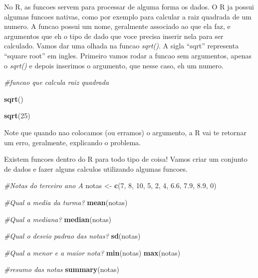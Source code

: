 \documentclass[
]{book}
\newenvironment{Shaded}{\begin{snugshade}}{\end{snugshade}}
\newcommand{\CommentTok}[1]{\textcolor[rgb]{0.56,0.35,0.01}{\textit{#1}}}
\newcommand{\DecValTok}[1]{\textcolor[rgb]{0.00,0.00,0.81}{#1}}
\newcommand{\FloatTok}[1]{\textcolor[rgb]{0.00,0.00,0.81}{#1}}
\newcommand{\FunctionTok}[1]{\textcolor[rgb]{0.13,0.29,0.53}{\textbf{#1}}}
\newcommand{\NormalTok}[1]{#1}
\newcommand{\OtherTok}[1]{\textcolor[rgb]{0.56,0.35,0.01}{#1}}
\begin{document}
No R, as funcoes servem para processar de alguma forma os dados. O R ja possui algumas funcoes nativas, como por exemplo para calcular a raiz quadrada de um numero. A funcao possui um nome, geralmente associado ao que ela faz, e argumentos que eh o tipo de dado que voce precisa inserir nela para ser calculado. Vamos dar uma olhada na funcao \emph{sqrt()}. A sigla ``sqrt'' representa ``square root'' em ingles. Primeiro vamos rodar a funcao sem argumentos, apenas o \emph{sqrt()} e depois inserimos o argumento, que nesse caso, eh um numero.

\begin{Shaded}
\begin{Highlighting}[]
\CommentTok{\#funcao que calcula raiz quadrada}

\FunctionTok{sqrt}\NormalTok{()}

\FunctionTok{sqrt}\NormalTok{(}\DecValTok{25}\NormalTok{)}
\end{Highlighting}
\end{Shaded}

Note que quando nao colocamos (ou erramos) o argumento, a R vai te retornar um erro, geralmente, explicando o problema.

Existem funcoes dentro do R para todo tipo de coisa! Vamos criar um conjunto de dados e fazer alguns calculos utilizando algumas funcoes.

\begin{Shaded}
\begin{Highlighting}[]
\CommentTok{\#Notas do terceiro ano A}
\NormalTok{notas }\OtherTok{\textless{}{-}} \FunctionTok{c}\NormalTok{(}\DecValTok{7}\NormalTok{, }\DecValTok{8}\NormalTok{, }\DecValTok{10}\NormalTok{, }\DecValTok{5}\NormalTok{, }\DecValTok{2}\NormalTok{, }\DecValTok{4}\NormalTok{, }\FloatTok{6.6}\NormalTok{, }\FloatTok{7.9}\NormalTok{, }\FloatTok{8.9}\NormalTok{, }\DecValTok{0}\NormalTok{)}

\CommentTok{\#Qual a media da turma?}
\FunctionTok{mean}\NormalTok{(notas)}

\CommentTok{\#Qual a mediana?}
\FunctionTok{median}\NormalTok{(notas)}

\CommentTok{\#Qual o desvio padrao das notas?}
\FunctionTok{sd}\NormalTok{(notas)}

\CommentTok{\#Qual a menor e a maior nota?}
\FunctionTok{min}\NormalTok{(notas)}
\FunctionTok{max}\NormalTok{(notas)}

\CommentTok{\#resumo das notas}
\FunctionTok{summary}\NormalTok{(notas)}
\end{Highlighting}
\end{Shaded}
\end{document}
